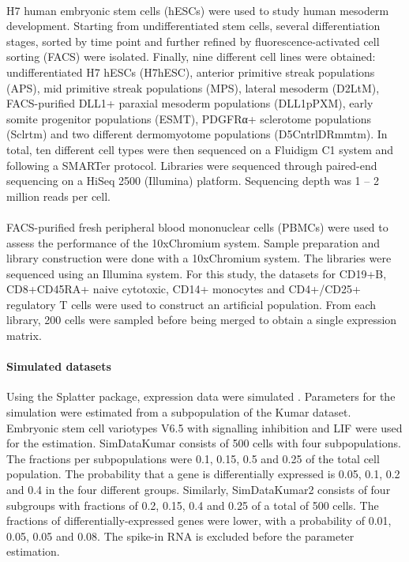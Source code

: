 \documentclass[12pt, a4paper]{article}\usepackage[]{graphicx}\usepackage[]{color}
\begin{document}
\paragraph{\citet{koh2016atlas} }
H7 human embryonic stem cells (hESCs) were used to study human mesoderm development. Starting from undifferentiated stem cells, several differentiation stages, sorted by time point and further refined by fluorescence-activated cell sorting (FACS) were isolated. Finally, nine different cell lines were obtained:  undifferentiated H7 hESCs (H7hESC), anterior primitive streak populations (APS), mid primitive streak populations (MPS), lateral mesoderm (D2LtM), FACS-purified DLL1+ paraxial mesoderm populations (DLL1pPXM), early somite progenitor populations (ESMT), PDGFRα+ sclerotome populations (Sclrtm) and two different dermomyotome populations (D5CntrlDRmmtm).
In total, ten different cell types were then sequenced on a Fluidigm C1 system and following a SMARTer protocol. Libraries were sequenced through paired-end sequencing on a HiSeq 2500 (Illumina) platform. Sequencing depth was 1 -- 2 million reads per cell. 
\paragraph{ \citet{zheng2017massively}}
FACS-purified fresh peripheral blood mononuclear cells (PBMCs) were used to assess the performance of the 10xChromium system. Sample preparation and library construction were done with a 10xChromium system. The libraries were sequenced using an Illumina system. For this study, the datasets for CD19+B, CD8+CD45RA+ naive cytotoxic, CD14+ monocytes and CD4+/CD25+ regulatory T cells were used to construct an artificial population. From each library, 200 cells were sampled before being merged to obtain a single expression matrix.
\paragraph{Simulated datasets }
Using the Splatter package, expression data were simulated \citep{oshlack2017splatter}. Parameters for the simulation were estimated from a subpopulation of the Kumar dataset.  Embryonic stem cell variotypes V6.5 with signalling inhibition and LIF were used for the estimation. SimDataKumar consists of 500 cells with four subpopulations. The fractions per subpopulations were 0.1, 0.15, 0.5 and 0.25 of the total cell population. The probability that a gene is differentially expressed is 0.05, 0.1, 0.2 and 0.4 in the four different groups. Similarly, SimDataKumar2 consists of four subgroups with fractions of 0.2, 0.15, 0.4 and 0.25 of a total of 500 cells. The fractions of differentially-expressed genes were lower, with a probability of 0.01, 0.05, 0.05 and 0.08. The spike-in RNA is excluded before the parameter estimation.
\end{document}
